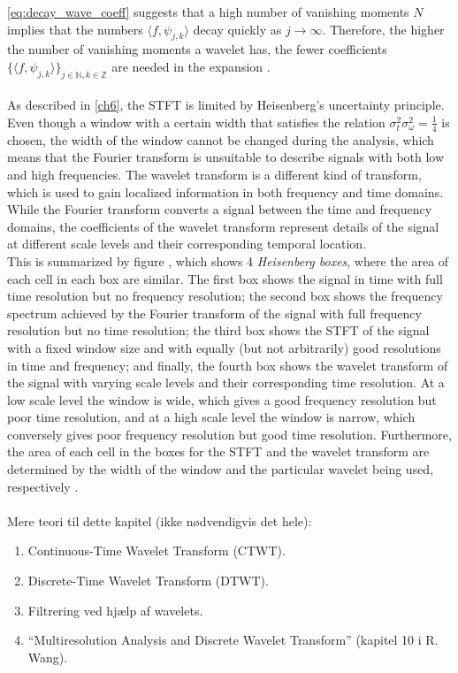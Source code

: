\eqref{eq:decay_wave_coeff} suggests that a high number of vanishing moments $N$ implies that the numbers $\langle f, \psi_{j,k} \rangle$ decay quickly as $j \to \infty$. Therefore, the higher the number of vanishing moments a wavelet has, the fewer coefficients $\{ \langle f, \psi_{j,k} \rangle \}_{j\in\mathbb{N},k\in\mathbb{Z}}$ are needed in the expansion \cite{page 170, FSE2010}.
\\ \\
As described in \ref{ch6}, the STFT is limited by Heisenberg's uncertainty principle. Even though a window with a certain width that satisfies the relation $\sigma_t^2 \sigma_\omega^2 = \frac{1}{4}$ is chosen, the width of the window cannot be changed during the analysis, which means that the Fourier transform is unsuitable to describe signals with both low and high frequencies. The wavelet transform is a different kind of transform, which is used to gain localized information in both frequency and time domains. While the Fourier transform converts a signal between the time and frequency domains, the coefficients of the wavelet transform represent details of the signal at different scale levels and their corresponding temporal location.
\\
This is summarized by figure , which shows 4 \textit{Heisenberg boxes}, where the area of each cell in each box are similar. The first box shows the signal in time with full time resolution but no frequency resolution; the second box shows the frequency spectrum achieved by the Fourier transform of the signal with full frequency resolution but no time resolution; the third box shows the STFT of the signal with a fixed window size and with equally (but not arbitrarily) good resolutions in time and frequency; and finally, the fourth box shows the wavelet transform of the signal with varying scale levels and their corresponding time resolution. At a low scale level the window is wide, which gives a good frequency resolution but poor time resolution, and at a high scale level the window is narrow, which conversely gives poor frequency resolution but good time resolution. Furthermore, the area of each cell in the boxes for the STFT and the wavelet transform are determined by the width of the window and the particular wavelet being used, respectively \cite{pages 409-410, Wang} \cite{page 43-44, wave_tut}.
\\ \\
Mere teori til dette kapitel (ikke nødvendigvis det hele):
\begin{enumerate}
\item Continuous-Time Wavelet Transform (CTWT).
\item Discrete-Time Wavelet Transform (DTWT).
\item Filtrering ved hjælp af wavelets.
\item ``Multiresolution Analysis and Discrete Wavelet Transform'' (kapitel 10 i R. Wang).
\end{enumerate}